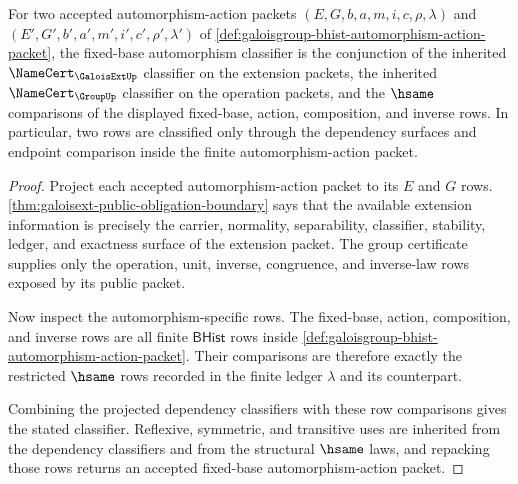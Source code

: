 \begin{theorem}
\label{thm:galoisgroup-fixed-base-classifier}
For two accepted automorphism-action packets
$(E,G,b,a,m,i,c,\rho,\lambda)$ and
$(E',G',b',a',m',i',c',\rho',\lambda')$ of
\autoref{def:galoisgroup-bhist-automorphism-action-packet}, the fixed-base
automorphism classifier is the conjunction of the inherited
$\NameCert_{\GaloisExtUp}$ classifier on the extension packets, the inherited
$\NameCert_{\GroupUp}$ classifier on the operation packets, and the $\hsame$
comparisons of the displayed fixed-base, action, composition, and inverse
rows. In particular, two rows are classified only through the dependency
surfaces and endpoint comparison inside the finite automorphism-action packet.
\end{theorem}
\begin{proof}
Project each accepted automorphism-action packet to its $E$ and $G$ rows.
\autoref{thm:galoisext-public-obligation-boundary} says that the available
extension information is precisely the carrier, normality, separability,
classifier, stability, ledger, and exactness surface of the extension packet.
The group certificate supplies only the operation, unit, inverse, congruence,
and inverse-law rows exposed by its public packet.

Now inspect the automorphism-specific rows. The fixed-base, action,
composition, and inverse rows are all finite $\mathsf{BHist}$ rows inside
\autoref{def:galoisgroup-bhist-automorphism-action-packet}. Their comparisons
are therefore exactly the restricted $\hsame$ rows recorded in the finite
ledger $\lambda$ and its counterpart.

Combining the projected dependency classifiers with these row comparisons
gives the stated classifier. Reflexive, symmetric, and transitive uses are
inherited from the dependency classifiers and from the structural $\hsame$
laws, and repacking those rows returns an accepted fixed-base
automorphism-action packet.
\end{proof}

